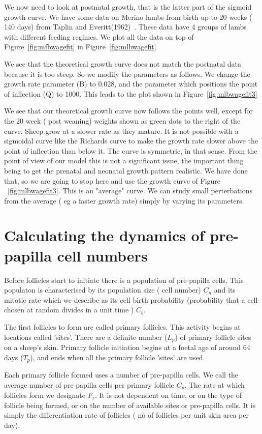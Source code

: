 \documentclass[titlepage]{article}  %
\begin{document}
We now need to look at postnatal growth, that is the latter part of the sigmoid growth curve. We have some data on Merino lambs from birth up to 20 weeks ( 140 days) from Taplin and Everitt(1962)~\cite{tapl:62}. These  data have 4 groups of lambs with different feeding regimes. We plot all the data on top of Figure~\ref{fig:mfbwagefit} in Figure~\ref{fig:mlbwagefit}

We see that the theoretical growth curve does not match the postnatal data because it is too steep. So we modify the parameters as follows. We change the growth rate parameter (B) to 0.028, and the parameter which positions the point of inflection (Q) to 1000. This leads to the plot shown in Figure~\ref{fig:mlbwagefit3}

We see that our theoretical growth curve now follows the points well, except for the 20 week ( post weaning) weights shown as green dots to the right of the curve. Sheep grow at a slower rate as they mature. It is not possible with a sigmoidal curve like the Richards curve to make the growth rate slower above the point of inflection than below it. The curve is symmetric, in that sense. From the point of view of our model this is not a significant issue, the important thing being to get the prenatal and neonatal growth pattern realistic. We have done that, so we are going to stop here and use the growth curve of Figure ~\ref{fig:mlbwagefit3}.  This is an "average" curve. We can study small perterbations from the average ( eg a faster growth rate) simply by varying its parameters.

\section{Calculating the dynamics of pre-papilla cell numbers}
\label{sec:calc}
 Before follicles start to initiate there is a population of pre-papilla cells. This populaton is characterised by its population size ( cell number) $C_{n}$
and its mitotic rate which we describe as its cell birth probability (probability that a cell chosen at random divides in a unit time ) $C_{b}$.

 The first follicles to form are called primary follicles. This activity begins at locations called 'sites'. There are a definite number ($L_{p}$) of primary follicle sites on a sheep's skin. Primary follicle initiation begins at a foetal age of around 64 days ($T_{p}$), and ends when all the primary follicle 'sites' are used.

Each primary follicle formed uses a number of pre-papilla cells. We call the average number of pre-papilla cells per primary follicle $C_{p}$. The rate at which follicles form we designate $F_{r}$. It is not dependent on time, or on the type of follicle being formed, or on the number of available sites or pre-papilla cells. It is simply the differentiation rate of follicles ( no of follicles per unit skin area per day). 
\end{document}
